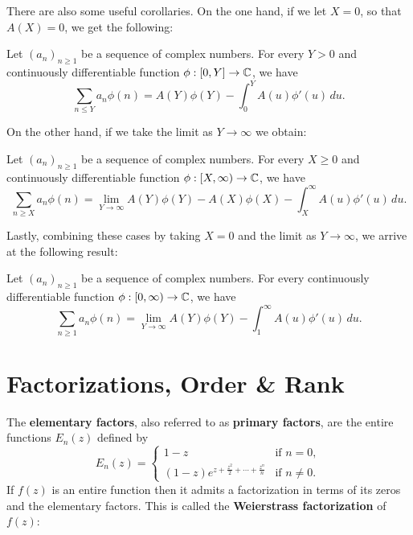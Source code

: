     There are also some useful corollaries. On the one hand, if we let $X = 0$, so that $A(X) = 0$, we get the following:

    \begin{corollary}\label{cor:Abels_summation_formula_zero_version}
      Let $(a_{n})_{n \ge 1}$ be a sequence of complex numbers. For every $Y > 0$ and continuously differentiable function $\phi:[0,Y] \to \mathbb{C}$, we have
      \[
        \sum_{n \le Y}a_{n}\phi(n) = A(Y)\phi(Y)-\int_{0}^{Y}A(u)\phi'(u)\,du.
      \]
    \end{corollary}
    
    On the other hand, if we take the limit as $Y \to \infty$ we obtain:

    \begin{corollary}\label{cor:Abels_summation_formula_limit_version}
      Let $(a_{n})_{n \ge 1}$ be a sequence of complex numbers. For every $X \ge 0$ and continuously differentiable function $\phi:[X,\infty) \to \mathbb{C}$, we have
      \[
        \sum_{n \ge X}a_{n}\phi(n) = \lim_{Y \to \infty}A(Y)\phi(Y)-A(X)\phi(X)-\int_{X}^{\infty}A(u)\phi'(u)\,du.
      \]
    \end{corollary}

    Lastly, combining these cases by taking $X = 0$ and the limit as $Y \to \infty$, we arrive at the following result:

    \begin{corollary}\label{cor:Abels_summation_formula_limit_version_specialization}
      Let $(a_{n})_{n \ge 1}$ be a sequence of complex numbers. For every continuously differentiable function $\phi:[0,\infty) \to \mathbb{C}$, we have
      \[
        \sum_{n \ge 1}a_{n}\phi(n) = \lim_{Y \to \infty}A(Y)\phi(Y)-\int_{1}^{\infty}A(u)\phi'(u)\,du.
      \]
    \end{corollary}
  \section{Factorizations, Order \& Rank}\label{append:Factorizations_and_Finite_Order}
    The \textbf{elementary factors}, also referred to as \textbf{primary factors}, are the entire functions $E_{n}(z)$ defined by
    \[
      E_{n}(z) = \begin{cases} 1-z & \text{if } n = 0, \\ (1-z)e^{z+\frac{z^{2}}{2}+\cdots+\frac{z^{n}}{n}} & \text{if } n \neq 0. \end{cases}
    \]
    If $f(z)$ is an entire function then it admits a factorization in terms of its zeros and the elementary factors. This is called the \textbf{Weierstrass factorization} of $f(z)$:

